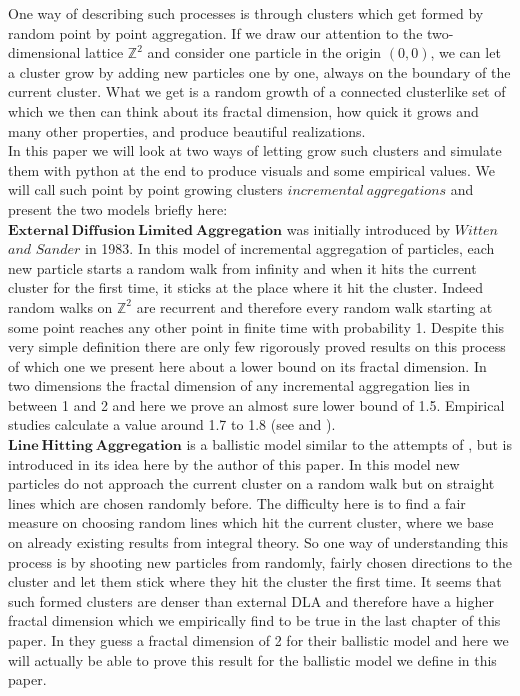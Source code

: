 \documentclass[12pt,a4paper]{scrartcl}
\numberwithin{equation}{subsection}
\newcommand{\Z}{\mathbb{Z}} %
\newcommand{\1}{\mathbbm{1}}
\numberwithin{equation}{section}
\theoremstyle{definition}
\begin{document}
	\noindent One way of describing such processes is through clusters which get formed by random point by point aggregation. If we draw our attention to the two-dimensional lattice $\Z^2$ and consider one particle in the origin $(0,0)$, we can let a cluster grow by adding new particles one by one, always on the boundary of the current cluster. What we get is a random growth of a connected clusterlike set of which we then can think about its fractal dimension, how quick it grows and many other properties, and produce beautiful realizations. \\
	
	\noindent In this paper we will look at two ways of letting grow such clusters and simulate them with python at the end to produce visuals and some empirical values. We will call such point by point growing clusters $\mathit{incremental\ aggregations}$ and present the two models briefly here:\\

	\noindent $\mathbf{External\ Diffusion\ Limited\ Aggregation}$ was initially introduced by $\mathit{Witten}$ $\mathit{and}$ $\mathit{Sander}$ \cite{wittensander} in 1983. In this model of incremental aggregation of particles, each new particle starts a random walk from infinity and when it hits the current cluster for the first time, it sticks at the place where it hit the cluster. Indeed random walks on  $\Z^2$ are recurrent and therefore every random walk starting at some point reaches any other point in finite time with probability 1. Despite this very simple definition there are only few rigorously proved results on this process of which one we present here about a lower bound on its fractal dimension. In two dimensions the fractal dimension of any incremental aggregation lies in between 1 and 2 and here we prove an almost sure lower bound of 1.5. Empirical studies calculate a value around 1.7 to 1.8 (see \cite{vicsek} and \cite{magnetic}).  \\
	
	\noindent $\mathbf{Line\ Hitting\ Aggregation}$ is a ballistic model similar to the attempts of \cite{ballistic}, but is introduced in its idea here by the author of this paper. In this model new particles do not approach the current cluster on a random walk but on straight lines which are chosen randomly before. The difficulty here is to find a fair measure on choosing random lines which hit the current cluster, where we base on already existing results from integral theory. So one way of understanding this process is by shooting new particles from randomly, fairly chosen directions to the cluster and let them stick where they hit the cluster the first time. It seems that such formed clusters are denser than external DLA and therefore have a higher fractal dimension which we empirically find to be true in the last chapter of this paper. In \cite{ballistic} they guess a fractal dimension of 2 for their ballistic model and here we will actually be able to prove this result for the ballistic model we define in this paper. \\
	
\end{document}
